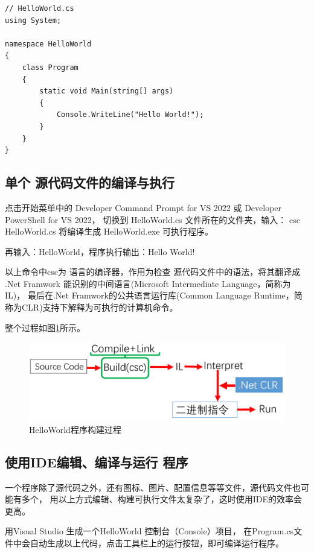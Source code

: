 \begin{lstlisting}
// HelloWorld.cs
using System;

namespace HelloWorld
{
	class Program
	{
		static void Main(string[] args) 
		{
			Console.WriteLine("Hello World!");
		}
	}
}
\end{lstlisting}



\subsection{单个 \cs  源代码文件的编译与执行}
点击开始菜单中的 Developer Command Prompt for VS 2022 或 Developer PowerShell for VS 2022，
切换到 HelloWorld.cs 文件所在的文件夹，输入： csc HelloWorld.cs 将编译生成 HelloWorld.exe 
可执行程序。

再输入：HelloWorld，程序执行输出：Hello World!

以上命令中csc为 \cs 语言的编译器，作用为检查 \cs 源代码文件中的语法，将其翻译成 .Net Framwork 
能识别的中间语言(Microsoft Intermediate Language，简称为IL)，
最后在.Net Framwork的公共语言运行库(Common Language Runtime，简称为CLR)支持下解释为可执行的计算机命令。

整个过程如图\ref{fig:BuildHelloWorld}所示。
\begin{figure}[htbp]
	\centering
	\includegraphics[scale=0.8]{chapter/csenv/BuildHelloWorld.png}
	\caption{HelloWorld程序构建过程}
	\label{fig:BuildHelloWorld}
\end{figure}

\subsection{使用IDE编辑、编译与运行 \cs 程序}
一个程序除了源代码之外，还有图标、图片、配置信息等等文件，源代码文件也可能有多个，
用以上方式编辑、构建可执行文件太复杂了，这时使用IDE的效率会更高。

用Visual Studio 生成一个HelloWorld 控制台（Console）项目，
在Program.cs文件中会自动生成以上代码，点击工具栏上的运行按钮，即可编译运行程序。

